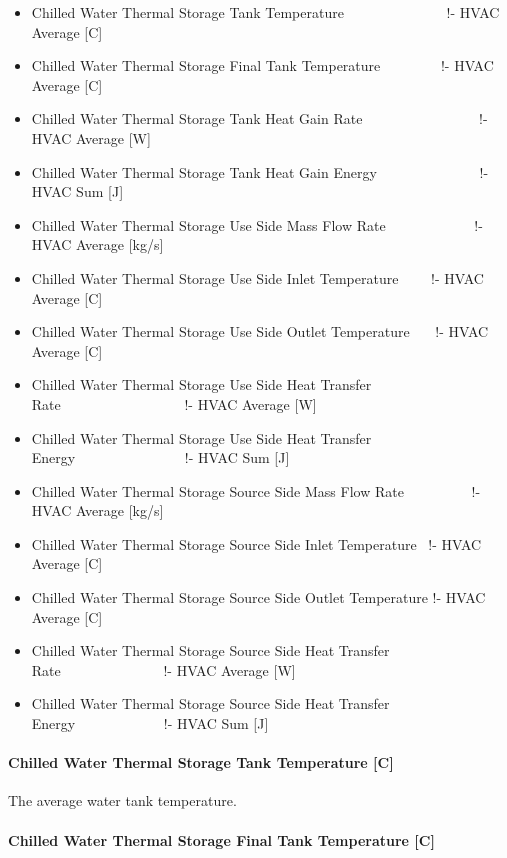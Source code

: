 \begin{itemize}
\item
  Chilled Water Thermal Storage Tank Temperature~~~~~~~~~~~~~~ !- HVAC Average {[}C{]}
\item
  Chilled Water Thermal Storage Final Tank Temperature~~~~~~~~ !- HVAC Average {[}C{]}
\item
  Chilled Water Thermal Storage Tank Heat Gain Rate~~~~~~~~~~~~~~~~ !- HVAC Average {[}W{]}
\item
  Chilled Water Thermal Storage Tank Heat Gain Energy~~~~~~~~~~~~~~ !- HVAC Sum {[}J{]}
\item
  Chilled Water Thermal Storage Use Side Mass Flow Rate~~~~~~~~~~~~ !- HVAC Average {[}kg/s{]}
\item
  Chilled Water Thermal Storage Use Side Inlet Temperature~~~~ !- HVAC Average {[}C{]}
\item
  Chilled Water Thermal Storage Use Side Outlet Temperature~~~ !- HVAC Average {[}C{]}
\item
  Chilled Water Thermal Storage Use Side Heat Transfer Rate~~~~~~~~~~~~~~~~~ !- HVAC Average {[}W{]}
\item
  Chilled Water Thermal Storage Use Side Heat Transfer Energy~~~~~~~~~~~~~~~ !- HVAC Sum {[}J{]}
\item
  Chilled Water Thermal Storage Source Side Mass Flow Rate~~~~~~~~~ !- HVAC Average {[}kg/s{]}
\item
  Chilled Water Thermal Storage Source Side Inlet Temperature~ !- HVAC Average {[}C{]}
\item
  Chilled Water Thermal Storage Source Side Outlet Temperature !- HVAC Average {[}C{]}
\item
  Chilled Water Thermal Storage Source Side Heat Transfer Rate~~~~~~~~~~~~~~ !- HVAC Average {[}W{]}
\item
  Chilled Water Thermal Storage Source Side Heat Transfer Energy~~~~~~~~~~~~ !- HVAC Sum {[}J{]}
\end{itemize}

\paragraph{Chilled Water Thermal Storage Tank Temperature {[}C{]}}\label{chilled-water-thermal-storage-tank-temperature-c}

The average water tank temperature.

\paragraph{Chilled Water Thermal Storage Final Tank Temperature {[}C{]}}\label{chilled-water-thermal-storage-final-tank-temperature-c}

